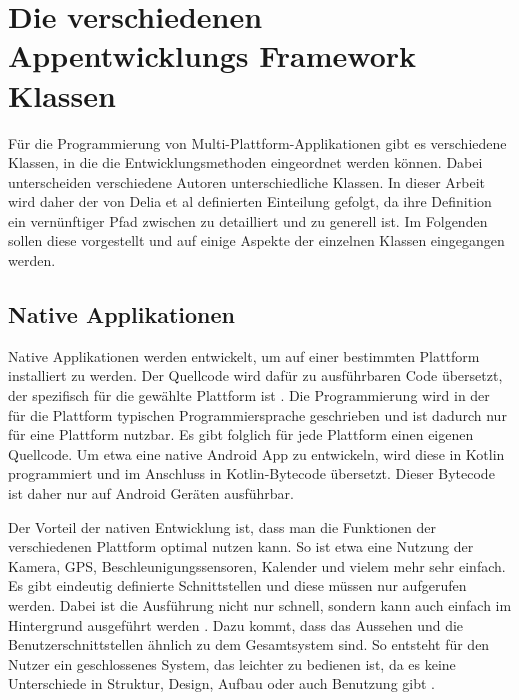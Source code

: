 \section{Die verschiedenen Appentwicklungs Framework Klassen}
Für die Programmierung von Multi-Plattform-Applikationen gibt es verschiedene Klassen, in die die Entwicklungsmethoden eingeordnet werden können. Dabei unterscheiden verschiedene Autoren unterschiedliche Klassen. In dieser Arbeit wird daher der von Delia et al \cite{IEEE_development_classes} definierten Einteilung gefolgt, da ihre Definition ein vernünftiger Pfad zwischen zu detailliert und zu generell ist. Im Folgenden sollen diese vorgestellt und auf einige Aspekte der einzelnen Klassen eingegangen werden.

\subsection{Native Applikationen}
Native Applikationen werden entwickelt, um auf einer bestimmten Plattform installiert zu werden. Der Quellcode wird dafür zu ausführbaren Code übersetzt, der spezifisch für die gewählte Plattform ist \cite{IEEE_development_classes}.
Die Programmierung wird in der für die Plattform typischen Programmiersprache geschrieben und ist dadurch nur für eine Plattform nutzbar. Es gibt folglich für jede Plattform einen eigenen Quellcode. Um etwa eine native Android App zu entwickeln, wird diese in Kotlin programmiert und im Anschluss in Kotlin-Bytecode übersetzt. Dieser Bytecode ist daher nur auf Android Geräten ausführbar.

Der Vorteil der nativen Entwicklung ist, dass man die Funktionen der verschiedenen Plattform optimal nutzen kann. So ist etwa eine Nutzung der Kamera, GPS, Beschleunigungssensoren, Kalender und vielem mehr sehr einfach. Es gibt eindeutig definierte Schnittstellen und diese müssen nur aufgerufen werden. Dabei ist die Ausführung nicht nur schnell, sondern kann auch einfach im Hintergrund ausgeführt werden \cite{IEEE_development_classes}. Dazu kommt, dass das Aussehen und die Benutzerschnittstellen ähnlich zu dem Gesamtsystem sind. So entsteht für den Nutzer ein geschlossenes System, das leichter zu bedienen ist, da es keine Unterschiede in Struktur, Design, Aufbau oder auch Benutzung gibt \cite{IEEE_Khackouch_Al}.

